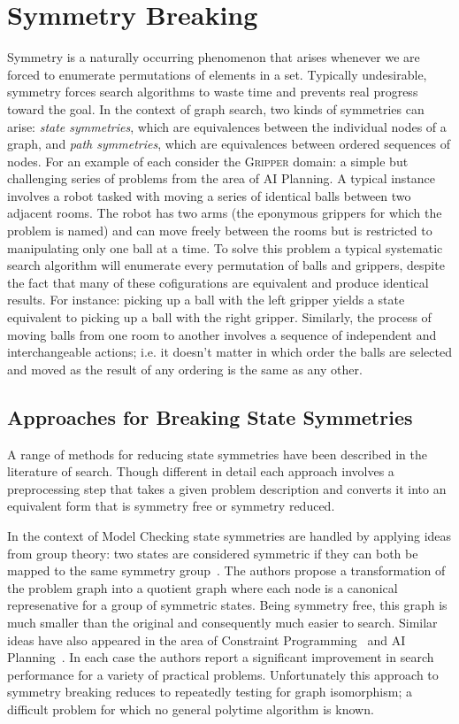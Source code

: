 \section{Symmetry Breaking}
\label{cha::lit::symmetry}
Symmetry is a naturally occurring phenomenon that arises whenever we are forced
to enumerate permutations of elements in a set. Typically
undesirable, symmetry forces search algorithms to waste time and prevents real 
progress toward the goal.
In the context of graph search, two kinds of symmetries can arise: \emph{state
symmetries}, which are equivalences between the individual nodes of a graph,
and \emph{path symmetries}, which are equivalences between ordered sequences of
nodes.
For an example of each consider the \textsc{Gripper} domain: a simple
but challenging series of problems from the area of AI Planning. A typical instance
involves a robot tasked with moving a series of identical balls between two adjacent rooms.
The robot has two arms (the eponymous grippers for which the problem is named) and can
move freely between the rooms but is restricted to manipulating only one
ball at a time.
To solve this problem a typical systematic search algorithm will enumerate every 
permutation of balls and grippers, despite the fact that many of these cofigurations
are equivalent and produce identical results. For instance: picking up a ball with 
the left gripper yields a state equivalent to picking up a ball with the right gripper.
 Similarly, the process of moving balls from one room to another involves a sequence of
independent and interchangeable actions; i.e. it doesn't matter in which order 
the balls are selected and moved as the result of any ordering is the same as any other.

\subsection{Approaches for Breaking State Symmetries}
\label{cha::lit::symmetry::state}
A range of methods for reducing state symmetries have been described in the literature of 
search. Though different in detail each approach involves a preprocessing step that takes a given
problem description and converts it into an equivalent form that is symmetry free or symmetry 
reduced.

In the context of Model Checking state symmetries are handled by applying ideas from group theory:
two states are considered symmetric if they can both be mapped to the same symmetry
group~\citep{emerson96}.  The authors propose a transformation of the problem graph into a quotient
graph where each node is a canonical represenative for a group of symmetric states. Being symmetry
free, this graph is much smaller than the original and consequently much easier to search.  Similar
ideas have also appeared in the area of Constraint Programming~\citep{crawford96,roney-dougal04} and AI
Planning~\citep{pochter11}. In each case the authors report a significant improvement in search
performance for a variety of practical problems. Unfortunately this approach to symmetry breaking
reduces to repeatedly testing for graph isomorphism; a difficult problem for which no general
polytime algorithm is known.

